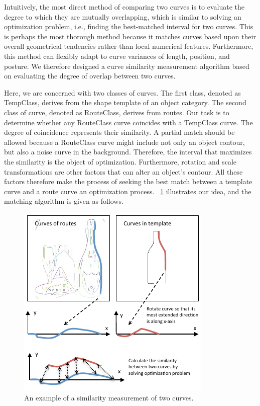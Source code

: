 \documentclass[journal]{IEEEtran}
\begin{document}
Intuitively, the most direct method of comparing two curves is to evaluate the degree to which they are mutually overlapping, 
which is similar to solving an optimization problem, i.e., 
finding the best-matched interval for two curves. 
This is perhaps the most thorough method because it matches curves based upon their overall geometrical tendencies rather than local numerical features. 
Furthermore, this method can flexibly adapt to curve variances of length, position, and posture. 
We therefore designed a curve similarity measurement algorithm based on evaluating the degree of overlap between two curves. 

Here, we are concerned with two classes of curves. 
The first class, denoted as TempClass, derives from the shape template of an object category. 
The second class of curve, denoted as RouteClass, derives from routes. 
Our task is to determine whether any RouteClass curve coincides with a TempClass curve. 
The degree of coincidence represents their similarity. 
A partial match should be allowed because a RouteClass curve might include not only an object contour, 
but also a noise curve in the background. 
Therefore, the interval that maximizes the similarity is the object of optimization. 
Furthermore, rotation and scale transformations are other factors that can alter an object's contour. 
All these factors therefore make the process of seeking the best match between a template curve and a route curve an optimization process. 
\figurename~\ref{fig:12} illustrates our idea, and the matching algorithm is given as follows.

\begin{figure}[!t]
\centering
\includegraphics[width=0.8\linewidth]{images/fig12.pdf}
\caption{An example of a similarity measurement of two curves.}
\label{fig:12}
\end{figure}
\end{document}
